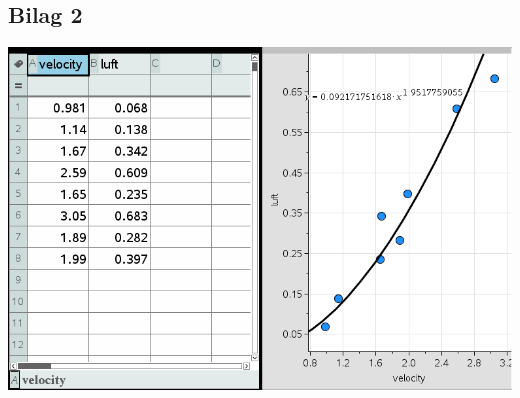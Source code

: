 \documentclass[12pt]{article}
\begin{document}
\subsection*{Bilag 2}
\begin{center}
\includegraphics[width=\linewidth]{Ligningforluftmodstand.png}
\end{center}
\end{document}
